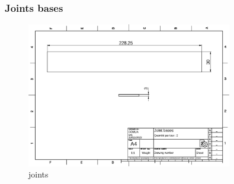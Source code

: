 \documentclass[a4paper]{article}
\begin{document}
\subsubsection{Joints bases}
\begin{figure}[H]
    \centering
    \includegraphics*[width=0.8\textwidth]{../plans/joint-base}
    \caption{joints}
    \label{fig:joints}
\end{figure}
\end{document}
